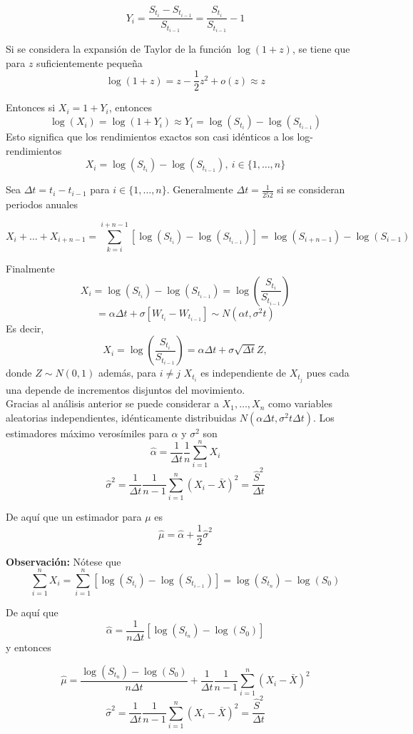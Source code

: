 \documentclass[11pt]{article}
\begin{document}
$$Y_i = \frac{S_{t_i}-S_{t_{i-1}}}{S_{t_{i-1}}}=\frac{S_{t_i}}{S_{t_{i-1}}}-1$$
	
Si se considera la expansión de Taylor de la función $\log(1+z)$, se tiene que para $z$ suficientemente pequeña
$$\log(1+z) = z-\frac{1}{2}z^2 + o(z) \approx z$$

Entonces si $X_i = 1+ Y_i$, entonces 
$$\log(X_i) = \log(1+Y_i) \approx Y_i = \log(S_{t_i})-\log(S_{t_{i-1}})$$
Esto significa que los rendimientos exactos son casi idénticos a los log-rendimientos
$$X_i = \log(S_{t_i})-\log(S_{t_{i-1}}),\ i\in\{1,\ldots,n\}$$
	
Sea $\Delta t = t_i - t_{i-1}$ para $i\in\{1,\ldots,n\}$. Generalmente $\Delta t = \frac{1}{252}$ si se consideran periodos anuales

$$X_i + \ldots + X_{i+n-1}=\sum_{k=i}^{i+n-1}[\log(S_{t_i})-\log(S_{t_{i-1}})]=\log(S_{i+n-1})-\log(S_{i-1})$$
	
Finalmente
$$X_i = \log(S_{t_i})-\log(S_{t_{i-1}}) = \log\left(\frac{S_{t_i}}{S_{t_{i-1}}}\right)$$
$$=\alpha \Delta t + \sigma[W_{t_i}-W_{t_{i-1}}]\sim N(\alpha t , \sigma^2 t)$$
Es decir,
$$X_i = \log\left(\frac{S_{t_i}}{S_{t_{i-1}}}\right) = \alpha \Delta t + \sigma\sqrt{\Delta t}Z,$$
donde $Z\sim N(0,1)$ además, para $i\neq j$ $X_{t_i}$ es independiente de $X_{t_j}$ pues cada una 
depende de incrementos disjuntos del movimiento.\\

Gracias al análisis anterior se puede considerar a $X_1,\ldots,X_n$  como variables aleatorias independientes, idénticamente distribuidas 
$N(\alpha\Delta t,\sigma^2t \Delta t)$. Los estimadores máximo verosímiles para 
$\alpha$ y $\sigma^2$ son
$$\widehat{\alpha}=\frac{1}{\Delta t}\frac{1}{n}\sum_{i=1}^n X_i$$
$$\widehat{\sigma}^2 = \frac{1}{\Delta t}\frac{1}{n-1}\sum_{i=1}^n(X_i-\bar{X})^2=\frac{\widehat{S}^2}{\Delta t}$$
	
De aquí que un estimador para $\mu$ es
$$\widehat{\mu} = \widehat{\alpha} + \frac{1}{2}\widehat{\sigma}^2$$
	
\textbf{Observación:}
Nótese que 
$$\sum_{i=1}^n X_i = \sum_{i=1}^n [\log(S_{t_i})-\log(S_{t_{i-1}})]=\log(S_{t_n})-\log(S_0)$$
	
De aquí que
$$\widehat{\alpha}=\frac{1}{n\Delta t}[\log(S_{t_n})-\log(S_0)]$$
y entonces
	
$$\widehat{\mu} =\frac{\log(S_{t_n})-\log(S_0)}{n\Delta t}+ \frac{1}{\Delta t}\frac{1}{n-1}\sum_{i=1}^n(X_i-\bar{X})^2$$
$$\widehat{\sigma}^2 = \frac{1}{\Delta t}\frac{1}{n-1}\sum_{i=1}^n(X_i-\bar{X})^2=\frac{\widehat{S}^2}{\Delta t}$$
	
\end{document}
